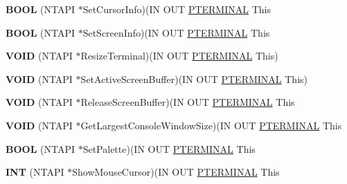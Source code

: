 \begin{DoxyCompactItemize}
{\bfseries B\+O\+OL} (N\+T\+A\+PI $\ast$Set\+Cursor\+Info)(IN O\+UT \hyperlink{struct___t_e_r_m_i_n_a_l}{P\+T\+E\+R\+M\+I\+N\+AL} This
\item 
\mbox{\label{struct___t_e_r_m_i_n_a_l___v_t_b_l_a164e580da120887d9283b87d6817f8bd}} 
{\bfseries B\+O\+OL} (N\+T\+A\+PI $\ast$Set\+Screen\+Info)(IN O\+UT \hyperlink{struct___t_e_r_m_i_n_a_l}{P\+T\+E\+R\+M\+I\+N\+AL} This
\item 
\mbox{\label{struct___t_e_r_m_i_n_a_l___v_t_b_l_a2c4be90273230c5a07cbd9d7fa0a2867}} 
{\bfseries V\+O\+ID} (N\+T\+A\+PI $\ast$Resize\+Terminal)(IN O\+UT \hyperlink{struct___t_e_r_m_i_n_a_l}{P\+T\+E\+R\+M\+I\+N\+AL} This)
\item 
\mbox{\label{struct___t_e_r_m_i_n_a_l___v_t_b_l_abb91048db354952494e15d760408dafc}} 
{\bfseries V\+O\+ID} (N\+T\+A\+PI $\ast$Set\+Active\+Screen\+Buffer)(IN O\+UT \hyperlink{struct___t_e_r_m_i_n_a_l}{P\+T\+E\+R\+M\+I\+N\+AL} This)
\item 
\mbox{\label{struct___t_e_r_m_i_n_a_l___v_t_b_l_a504e36806be0bb8a1240369788d70325}} 
{\bfseries V\+O\+ID} (N\+T\+A\+PI $\ast$Release\+Screen\+Buffer)(IN O\+UT \hyperlink{struct___t_e_r_m_i_n_a_l}{P\+T\+E\+R\+M\+I\+N\+AL} This
\item 
\mbox{\label{struct___t_e_r_m_i_n_a_l___v_t_b_l_a438d0d96611deeae8f851ed87c39cf42}} 
{\bfseries V\+O\+ID} (N\+T\+A\+PI $\ast$Get\+Largest\+Console\+Window\+Size)(IN O\+UT \hyperlink{struct___t_e_r_m_i_n_a_l}{P\+T\+E\+R\+M\+I\+N\+AL} This
\item 
\mbox{\label{struct___t_e_r_m_i_n_a_l___v_t_b_l_adb87a6fc5692324655de369cdb1b9636}} 
{\bfseries B\+O\+OL} (N\+T\+A\+PI $\ast$Set\+Palette)(IN O\+UT \hyperlink{struct___t_e_r_m_i_n_a_l}{P\+T\+E\+R\+M\+I\+N\+AL} This
\item 
\mbox{\label{struct___t_e_r_m_i_n_a_l___v_t_b_l_ae9458217f660a221e45b2fba86c6a14a}} 
{\bfseries I\+NT} (N\+T\+A\+PI $\ast$Show\+Mouse\+Cursor)(IN O\+UT \hyperlink{struct___t_e_r_m_i_n_a_l}{P\+T\+E\+R\+M\+I\+N\+AL} This
\end{DoxyCompactItemize}
